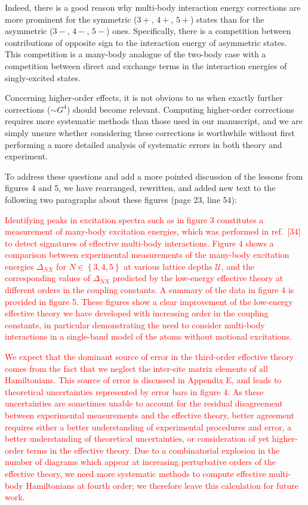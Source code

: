 \documentclass[preprint,showkeys,nofootinbib]{revtex4-1}
\renewcommand{\set}[1]{\left\{#1\right\}} %
\newcommand{\U}{\mathcal{U}}
\newcommand{\1}{\mathds{1}}
\newcommand{\red}[1]{\textcolor{red}{#1}}
\begin{document}
\begin{enumerate}
  Indeed, there is a good reason why multi-body interaction energy
  corrections are more prominent for the symmetric ($3+$, $4+$, $5+$)
  states than for the asymmetric ($3-$, $4-$, $5-$) ones.
  Specifically, there is a competition between contributions of
  opposite sign to the interaction energy of asymmetric states.  This
  competition is a many-body analogue of the two-body case with a
  competition between direct and exchange terms in the interaction
  energies of singly-excited states.

  Concerning higher-order effects, it is not obvious to us when
  exactly further corrections ($\sim G^4$) should become relevant.
  Computing higher-order corrections requires more systematic methods
  than those used in our manuscript, and we are simply unsure whether
  considering these corrections is worthwhile without first performing
  a more detailed analysis of systematic errors in both theory and
  experiment.

  To address these questions and add a more pointed discussion of the
  lessons from figures 4 and 5, we have rearranged, rewritten, and
  added new text to the following two paragraphs about these figures
  (page 23, line 54):

  \red{Identifying peaks in excitation spectra such as in figure 3
    constitutes a measurement of many-body excitation energies, which
    was performed in ref.~[34] to detect signatures of effective
    multi-body interactions.  Figure 4 shows a comparison between
    experimental measurements of the many-body excitation energies
    $\Delta_{NX}$ for $N\in\set{3,4,5}$ at various lattice depths
    $\U$, and the corresponding values of $\Delta_{NX}$ predicted by
    the low-energy effective theory at different orders in the
    coupling constants.  A summary of the data in figure 4 is provided
    in figure 5.  These figures show a clear improvement of the
    low-energy effective theory we have developed with increasing
    order in the coupling constants, in particular demonstrating the
    need to consider multi-body interactions in a single-band model of
    the atoms without motional excitations.}

  \red{We expect that the dominant source of error in the third-order
    effective theory comes from the fact that we neglect the
    inter-site matrix elements of all Hamiltonians.  This source of
    error is discussed in Appendix E, and leads to theoretical
    uncertainties represented by error bars in figure 4.  As these
    uncertainties are sometimes unable to account for the residual
    disagreement between experimental measurements and the effective
    theory, better agreement requires either a better understanding of
    experimental procedures and error, a better understanding of
    theoretical uncertainties, or consideration of yet higher-order
    terms in the effective theory.  Due to a combinatorial explosion
    in the number of diagrams which appear at increasing perturbative
    orders of the effective theory, we need more systematic methods to
    compute effective multi-body Hamiltonians at fourth order; we
    therefore leave this calculation for future work.}


\end{enumerate}
\end{document}
